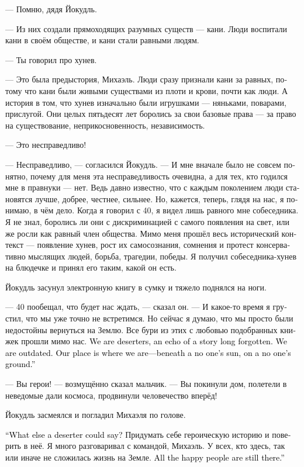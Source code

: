\documentclass[a4paper,12pt,fleqn]{book}\usepackage{cooltooltips}\usepackage{polyglossia}\setdefaultlanguage[babelshorthands=true]{russian}\setotherlanguage{english}\defaultfontfeatures{Ligatures=TeX,Mapping=tex-text} \usepackage{xcolor}\definecolor{lightgray}{HTML}{bbbbbb}\color{lightgray}\newcommand{\ml}[3]{\textenglish{\textcolor{black}{#3}}}
\begin{document}
--- Помню, дядя Йокудль.

--- Из них создали прямоходящих разумных существ --- кани.
Люди воспитали кани в своём обществе, и кани стали равными людям.

--- Ты говорил про хунев.

--- Это была предыстория, Михаэль.
Люди сразу признали кани за равных, потому что кани были живыми существами из плоти и крови, почти как люди.
А история в том, что хунев изначально были игрушками --- няньками, поварами, прислугой.
Они целых пятьдесят лет боролись за свои базовые права --- за право на существование, неприкосновенность, независимость.

--- Это несправедливо!

--- Несправедливо, --- согласился Йокудль.
--- И мне вначале было не совсем понятно, почему для меня эта несправедливость очевидна, а для тех, кто годился мне в правнуки --- нет.
Ведь давно известно, что с каждым поколением люди становятся лучше, добрее, честнее, сильнее.
Но, кажется, теперь, глядя на нас, я понимаю, в чём дело.
Когда я говорил с 40, я видел лишь равного мне собеседника.
Я не знал, боролись ли они с дискриминацией с самого появления на свет, или же росли как равный член общества.
Мимо меня прошёл весь исторический контекст --- появление хунев, рост их самосознания, сомнения и протест консервативно мыслящих людей, борьба, трагедии, победы.
Я получил собеседника-хунев на блюдечке и принял его таким, какой он есть.

Йокудль засунул электронную книгу в сумку и тяжело поднялся на ноги.

--- 40 пообещал, что будет нас ждать, --- сказал он.
--- И какое-то время я грустил, что мы уже точно не встретимся.
Но сейчас я думаю, что мы просто были недостойны вернуться на Землю.
Все бури из этих с любовью подобранных книжек прошли мимо нас.
\ml{$0$}
{Мы --- дезертиры, отголосок давно забытой истории.}
{We are deserters, an echo of a story long forgotten.}
\ml{$0$}
{Мы устарели.}
{We are outdated.}
\ml{$0$}
{И наше место --- там, где мы есть, под ничьим солнцем, на ничьей земле.}
{Our place is where we are---beneath a no one's sun, on a no one's ground.''}

--- Вы герои! --- возмущённо сказал мальчик.
--- Вы покинули дом, полетели в неведомые дали космоса, продвинули человечество вперёд!

Йокудль засмеялся и погладил Михаэля по голове.

\ml{$0$}
{--- Что ещё может сделать дезертир?}
{``What else a deserter could say?}
Придумать себе героическую историю и поверить в неё.
Я много разговаривал с командой, Михаэль.
У всех, кто здесь, так или иначе не сложилась жизнь на Земле.
\ml{$0$}
{Все счастливые остались там.}
{All the happy people are still there.''}
\end{document}
